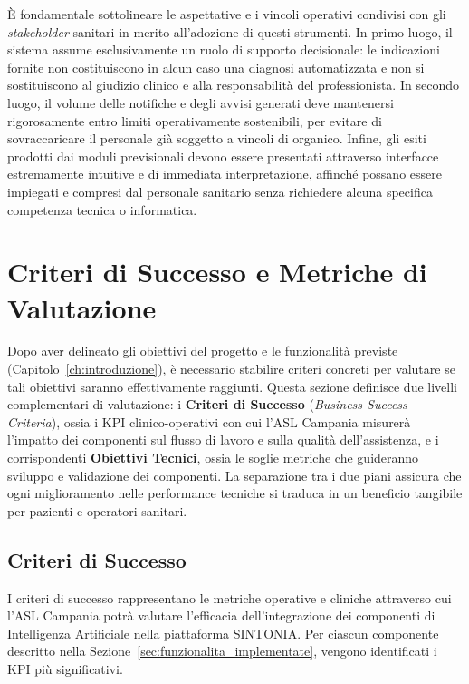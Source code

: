 È fondamentale sottolineare le aspettative e i vincoli operativi condivisi con gli \textit{stakeholder} sanitari in merito all'adozione di questi strumenti. In primo luogo, il sistema assume esclusivamente un ruolo di supporto decisionale: le indicazioni fornite non costituiscono in alcun caso una diagnosi automatizzata e non si sostituiscono al giudizio clinico e alla responsabilità del professionista. In secondo luogo, il volume delle notifiche e degli avvisi generati deve mantenersi rigorosamente entro limiti operativamente sostenibili, per evitare di sovraccaricare il personale già soggetto a vincoli di organico. Infine, gli esiti prodotti dai moduli previsionali devono essere presentati attraverso interfacce estremamente intuitive e di immediata interpretazione, affinché possano essere impiegati e compresi dal personale sanitario senza richiedere alcuna specifica competenza tecnica o informatica.

\section{Criteri di Successo e Metriche di Valutazione}
\label{sec:criteri_successo}

Dopo aver delineato gli obiettivi del progetto e le funzionalità previste (Capitolo~\ref{ch:introduzione}), è necessario stabilire criteri concreti per valutare se tali obiettivi saranno effettivamente raggiunti. Questa sezione definisce due livelli complementari di valutazione: i \textbf{Criteri di Successo} (\textit{Business Success Criteria}), ossia i KPI clinico-operativi con cui l'ASL Campania misurerà l'impatto dei componenti sul flusso di lavoro e sulla qualità dell'assistenza, e i corrispondenti \textbf{Obiettivi Tecnici}, ossia le soglie metriche che guideranno sviluppo e validazione dei componenti. La separazione tra i due piani assicura che ogni miglioramento nelle performance tecniche si traduca in un beneficio tangibile per pazienti e operatori sanitari.

\subsection{Criteri di Successo}
\label{subsec:business_success}

I criteri di successo rappresentano le metriche operative e cliniche attraverso cui l'ASL Campania potrà valutare l'efficacia dell'integrazione dei componenti di Intelligenza Artificiale nella piattaforma SINTONIA. Per ciascun componente descritto nella Sezione~\ref{sec:funzionalita_implementate}, vengono identificati i KPI più significativi.

